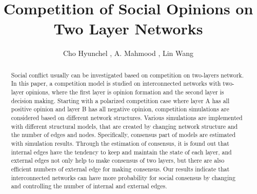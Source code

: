 \documentclass[english]{cccconf}
\begin{document}
\title{Competition of Social Opinions on Two Layer Networks}


\author{Cho Hyunchel ,
        A. Mahmood ,
        Lin Wang }

\maketitle

\begin{abstract}
Social conflict usually can be investigated based on competition on two-layers network. In this paper, a competition model is studied on interconnected networks with two-layer opinions, where the first layer is opinion formation and the second layer is decision making. Starting with a polarized competition case where layer A has all positive opinion and layer B has all negative opinion, competition simulations are considered based on different network structures. Various simulations are implemented with different structural models, that are created by changing network structure and the number of edges and nodes. Specifically, consensus part of models are estimated with simulation results. Through the estimation of consensus, it is found out that internal edges have the tendency to keep and maintain the state of each layer, and  external edges not only help to make consensus of two layers, but there are also efficient numbers of external edge for making consensus. Our results indicate that interconnected networks can have more probability for social consensus by changing and controlling the number of internal and external edges.  

\end{abstract}
\end{document}
